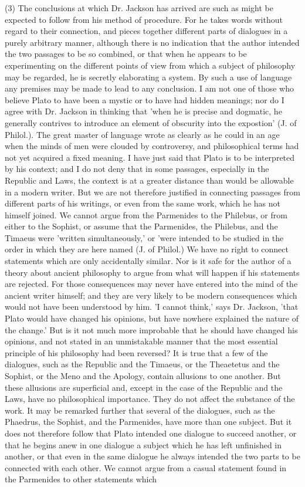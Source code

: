 \documentclass[11pt,letter]{article}
\begin{document}
\par  (3) The conclusions at which Dr. Jackson has arrived are such as might be expected to follow from his method of procedure. For he takes words without regard to their connection, and pieces together different parts of dialogues in a purely arbitrary manner, although there is no indication that the author intended the two passages to be so combined, or that when he appears to be experimenting on the different points of view from which a subject of philosophy may be regarded, he is secretly elaborating a system. By such a use of language any premises may be made to lead to any conclusion. I am not one of those who believe Plato to have been a mystic or to have had hidden meanings; nor do I agree with Dr. Jackson in thinking that 'when he is precise and dogmatic, he generally contrives to introduce an element of obscurity into the expostion' (J. of Philol.). The great master of language wrote as clearly as he could in an age when the minds of men were clouded by controversy, and philosophical terms had not yet acquired a fixed meaning. I have just said that Plato is to be interpreted by his context; and I do not deny that in some passages, especially in the Republic and Laws, the context is at a greater distance than would be allowable in a modern writer. But we are not therefore justified in connecting passages from different parts of his writings, or even from the same work, which he has not himself joined. We cannot argue from the Parmenides to the Philebus, or from either to the Sophist, or assume that the Parmenides, the Philebus, and the Timaeus were 'written simultaneously,' or 'were intended to be studied in the order in which they are here named (J. of Philol.) We have no right to connect statements which are only accidentally similar. Nor is it safe for the author of a theory about ancient philosophy to argue from what will happen if his statements are rejected. For those consequences may never have entered into the mind of the ancient writer himself; and they are very likely to be modern consequences which would not have been understood by him. 'I cannot think,' says Dr. Jackson, 'that Plato would have changed his opinions, but have nowhere explained the nature of the change.' But is it not much more improbable that he should have changed his opinions, and not stated in an unmistakable manner that the most essential principle of his philosophy had been reversed? It is true that a few of the dialogues, such as the Republic and the Timaeus, or the Theaetetus and the Sophist, or the Meno and the Apology, contain allusions to one another. But these allusions are superficial and, except in the case of the Republic and the Laws, have no philosophical importance. They do not affect the substance of the work. It may be remarked further that several of the dialogues, such as the Phaedrus, the Sophist, and the Parmenides, have more than one subject. But it does not therefore follow that Plato intended one dialogue to succeed another, or that he begins anew in one dialogue a subject which he has left unfinished in another, or that even in the same dialogue he always intended the two parts to be connected with each other. We cannot argue from a casual statement found in the Parmenides to other statements which 
\end{document}

